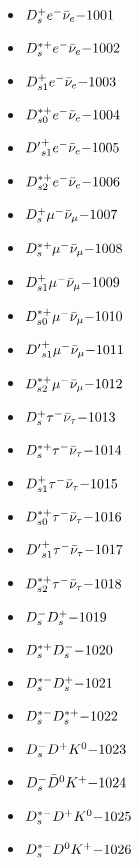 
 \begin{multicols}{3} 
 \begin{itemize}
 \item $ D_{s}^{+} e^{-} \bar{\nu}_{e} \hfill{-1001}$
 \item $ D_{s}^{*+} e^{-} \bar{\nu}_{e} \hfill{-1002}$
 \item $ D_{s1}^{+} e^{-} \bar{\nu}_{e} \hfill{-1003}$
 \item $ D_{s0}^{*+} e^{-} \bar{\nu}_{e} \hfill{-1004}$
 \item $ {D^{\prime}}_{s1}^{+} e^{-} \bar{\nu}_{e} \hfill{-1005}$
 \item $ D_{s2}^{*+} e^{-} \bar{\nu}_{e} \hfill{-1006}$
 \item $ D_{s}^{+} \mu^{-} \bar{\nu}_{\mu} \hfill{-1007}$
 \item $ D_{s}^{*+} \mu^{-} \bar{\nu}_{\mu} \hfill{-1008}$
 \item $ D_{s1}^{+} \mu^{-} \bar{\nu}_{\mu} \hfill{-1009}$
 \item $ D_{s0}^{*+} \mu^{-} \bar{\nu}_{\mu} \hfill{-1010}$
 \item $ {D^{\prime}}_{s1}^{+} \mu^{-} \bar{\nu}_{\mu} \hfill{-1011}$
 \item $ D_{s2}^{*+} \mu^{-} \bar{\nu}_{\mu} \hfill{-1012}$
 \item $ D_{s}^{+} \tau^{-} \bar{\nu}_{\tau} \hfill{-1013}$
 \item $ D_{s}^{*+} \tau^{-} \bar{\nu}_{\tau} \hfill{-1014}$
 \item $ D_{s1}^{+} \tau^{-} \bar{\nu}_{\tau} \hfill{-1015}$
 \item $ D_{s0}^{*+} \tau^{-} \bar{\nu}_{\tau} \hfill{-1016}$
 \item $ {D^{\prime}}_{s1}^{+} \tau^{-} \bar{\nu}_{\tau} \hfill{-1017}$
 \item $ D_{s2}^{*+} \tau^{-} \bar{\nu}_{\tau} \hfill{-1018}$
 \item $ D_{s}^{-} D_{s}^{+} \hfill{-1019}$
 \item $ D_{s}^{*+} D_{s}^{-} \hfill{-1020}$
 \item $ D_{s}^{*-} D_{s}^{+} \hfill{-1021}$
 \item $ D_{s}^{*-} D_{s}^{*+} \hfill{-1022}$
 \item $ D_{s}^{-} D^{+} K^{0} \hfill{-1023}$
 \item $ D_{s}^{-} \bar{D}^{0} K^{+} \hfill{-1024}$
 \item $ D_{s}^{*-} D^{+} K^{0} \hfill{-1025}$
 \item $ D_{s}^{*-} D^{0} K^{+} \hfill{-1026}$

\end{itemize}
\end{multicols}
